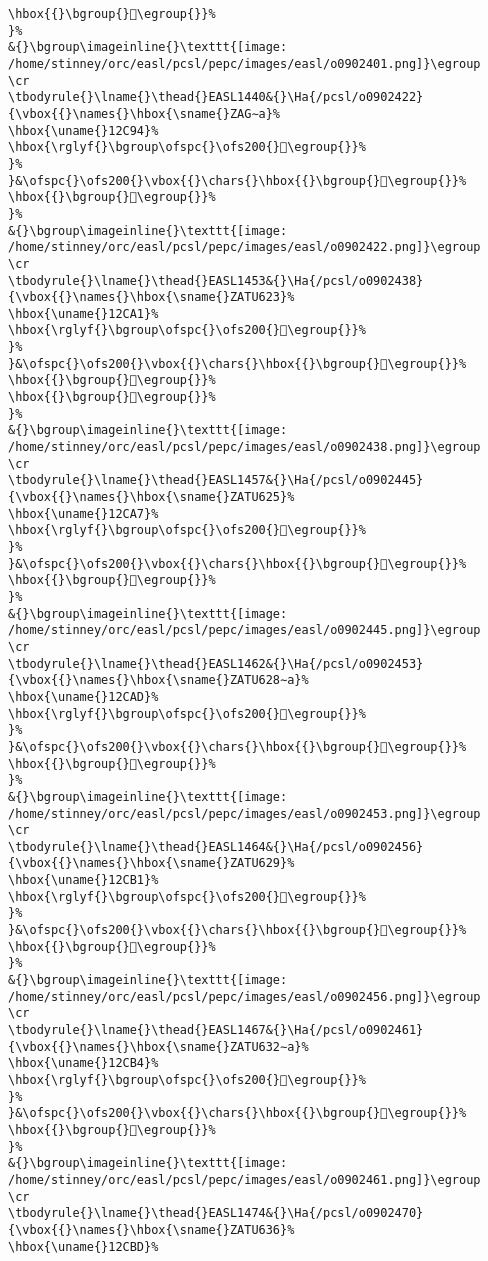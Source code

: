 \begin{verbatim}
\hbox{{}\bgroup{}𒲉\egroup{}}%
}%
&{}\bgroup\imageinline{}\texttt{[image: /home/stinney/orc/easl/pcsl/pepc/images/easl/o0902401.png]}\egroup
\cr
\tbodyrule{}\lname{}\thead{}EASL1440&{}\Ha{/pcsl/o0902422}{\vbox{{}\names{}\hbox{\sname{}ZAG∼a}%
\hbox{\uname{}12C94}%
\hbox{\rglyf{}\bgroup\ofspc{}\ofs200{}𒲔\egroup{}}%
}%
}&\ofspc{}\ofs200{}\vbox{{}\chars{}\hbox{{}\bgroup{}𒲓\egroup{}}%
\hbox{{}\bgroup{}𒲔\egroup{}}%
}%
&{}\bgroup\imageinline{}\texttt{[image: /home/stinney/orc/easl/pcsl/pepc/images/easl/o0902422.png]}\egroup
\cr
\tbodyrule{}\lname{}\thead{}EASL1453&{}\Ha{/pcsl/o0902438}{\vbox{{}\names{}\hbox{\sname{}ZATU623}%
\hbox{\uname{}12CA1}%
\hbox{\rglyf{}\bgroup\ofspc{}\ofs200{}𒲡\egroup{}}%
}%
}&\ofspc{}\ofs200{}\vbox{{}\chars{}\hbox{{}\bgroup{}𒲣\egroup{}}%
\hbox{{}\bgroup{}𒲢\egroup{}}%
\hbox{{}\bgroup{}𒲡\egroup{}}%
}%
&{}\bgroup\imageinline{}\texttt{[image: /home/stinney/orc/easl/pcsl/pepc/images/easl/o0902438.png]}\egroup
\cr
\tbodyrule{}\lname{}\thead{}EASL1457&{}\Ha{/pcsl/o0902445}{\vbox{{}\names{}\hbox{\sname{}ZATU625}%
\hbox{\uname{}12CA7}%
\hbox{\rglyf{}\bgroup\ofspc{}\ofs200{}𒲧\egroup{}}%
}%
}&\ofspc{}\ofs200{}\vbox{{}\chars{}\hbox{{}\bgroup{}𒲧\egroup{}}%
\hbox{{}\bgroup{}𒲨\egroup{}}%
}%
&{}\bgroup\imageinline{}\texttt{[image: /home/stinney/orc/easl/pcsl/pepc/images/easl/o0902445.png]}\egroup
\cr
\tbodyrule{}\lname{}\thead{}EASL1462&{}\Ha{/pcsl/o0902453}{\vbox{{}\names{}\hbox{\sname{}ZATU628∼a}%
\hbox{\uname{}12CAD}%
\hbox{\rglyf{}\bgroup\ofspc{}\ofs200{}𒲭\egroup{}}%
}%
}&\ofspc{}\ofs200{}\vbox{{}\chars{}\hbox{{}\bgroup{}𒲭\egroup{}}%
\hbox{{}\bgroup{}𒲮\egroup{}}%
}%
&{}\bgroup\imageinline{}\texttt{[image: /home/stinney/orc/easl/pcsl/pepc/images/easl/o0902453.png]}\egroup
\cr
\tbodyrule{}\lname{}\thead{}EASL1464&{}\Ha{/pcsl/o0902456}{\vbox{{}\names{}\hbox{\sname{}ZATU629}%
\hbox{\uname{}12CB1}%
\hbox{\rglyf{}\bgroup\ofspc{}\ofs200{}𒲱\egroup{}}%
}%
}&\ofspc{}\ofs200{}\vbox{{}\chars{}\hbox{{}\bgroup{}𒲰\egroup{}}%
\hbox{{}\bgroup{}𒲱\egroup{}}%
}%
&{}\bgroup\imageinline{}\texttt{[image: /home/stinney/orc/easl/pcsl/pepc/images/easl/o0902456.png]}\egroup
\cr
\tbodyrule{}\lname{}\thead{}EASL1467&{}\Ha{/pcsl/o0902461}{\vbox{{}\names{}\hbox{\sname{}ZATU632∼a}%
\hbox{\uname{}12CB4}%
\hbox{\rglyf{}\bgroup\ofspc{}\ofs200{}𒲴\egroup{}}%
}%
}&\ofspc{}\ofs200{}\vbox{{}\chars{}\hbox{{}\bgroup{}𒲴\egroup{}}%
\hbox{{}\bgroup{}𒲵\egroup{}}%
}%
&{}\bgroup\imageinline{}\texttt{[image: /home/stinney/orc/easl/pcsl/pepc/images/easl/o0902461.png]}\egroup
\cr
\tbodyrule{}\lname{}\thead{}EASL1474&{}\Ha{/pcsl/o0902470}{\vbox{{}\names{}\hbox{\sname{}ZATU636}%
\hbox{\uname{}12CBD}%

\end{verbatim}
